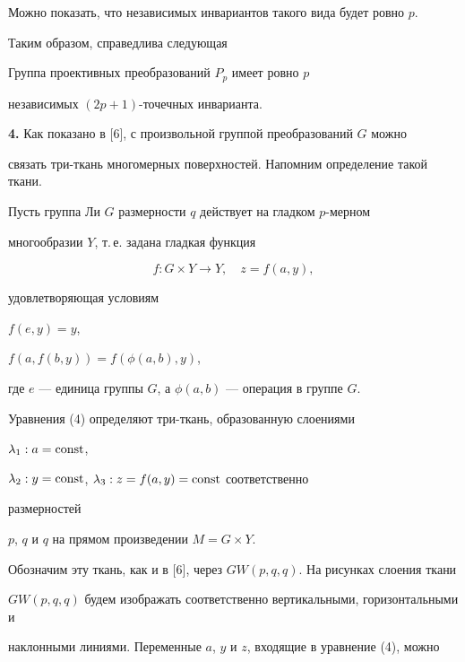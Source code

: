 Можно показать, что независимых инвариантов такого вида будет ровно $p$.


Таким образом, справедлива следующая





\begin{thm}


Группа проективных преобразований $P_p$ имеет ровно $p$


независимых $(2p+1)$-точечных инварианта.


\end{thm}





{\bf 4.} Как показано в [6], с произвольной группой преобразований $G$ можно


связать три-ткань многомерных поверхностей. Напомним определение такой ткани.





Пусть группа Ли $G$ размерности $q$ действует на гладком $p$-мерном


многообразии $Y$, т.\,е. задана гладкая функция


\begin{equation}


f:G \times Y \rightarrow Y, \quad z=f(a,y),


\end{equation}


удовлетворяющая условиям


$f(e,y)=y$, 


$f(a,f(b,y))=f(\phi(a,b),y)$,


где $e$ --- единица группы $G$, а $\phi(a,b)$ --- операция в группе $G$.


Уравнения (4) определяют три-ткань, образованную слоениями


$\lambda_{1}: a=\operatorname{const}$,


$\lambda_{2}: y=\operatorname{const}$, $\lambda_{3}: z=f(a,y)=\operatorname{const}$ соответственно 


размерностей


$p$, $q$ и $q$ на прямом произведении $M=G \times Y$.


Обозначим эту ткань, как и в [6], через $GW(p,q,q)$. На рисунках слоения ткани


$GW(p,q,q)$ будем изображать соответственно вертикальными, горизонтальными и


наклонными линиями. Переменные $a$, $y$ и $z$, входящие в уравнение (4), можно


